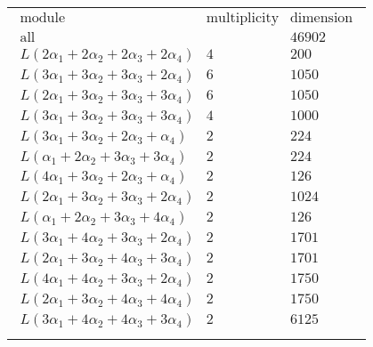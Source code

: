\documentclass[crop,border=2mm]{standalone}
\begin{document}
\begin{tabular}{l}
$\displaystyle
\begin{array}{rll}
	\text{module}&\text{multiplicity}&\text{dimension} \\ \hline \text{all}&&46902 \\
	L\left( 2\alpha_{1}+ 2\alpha_{2}+ 2\alpha_{3}+ 2\alpha_{4}\right)&4&200\\
	L\left( 3\alpha_{1}+ 3\alpha_{2}+ 3\alpha_{3}+ 2\alpha_{4}\right)&6&1050\\
	L\left( 2\alpha_{1}+ 3\alpha_{2}+ 3\alpha_{3}+ 3\alpha_{4}\right)&6&1050\\
	L\left( 3\alpha_{1}+ 3\alpha_{2}+ 3\alpha_{3}+ 3\alpha_{4}\right)&4&1000\\
	L\left( 3\alpha_{1}+ 3\alpha_{2}+ 2\alpha_{3}+\alpha_{4}\right)&2&224\\
	L\left(\alpha_{1}+ 2\alpha_{2}+ 3\alpha_{3}+ 3\alpha_{4}\right)&2&224\\
	L\left( 4\alpha_{1}+ 3\alpha_{2}+ 2\alpha_{3}+\alpha_{4}\right)&2&126\\
	L\left( 2\alpha_{1}+ 3\alpha_{2}+ 3\alpha_{3}+ 2\alpha_{4}\right)&2&1024\\
	L\left(\alpha_{1}+ 2\alpha_{2}+ 3\alpha_{3}+ 4\alpha_{4}\right)&2&126\\
	L\left( 3\alpha_{1}+ 4\alpha_{2}+ 3\alpha_{3}+ 2\alpha_{4}\right)&2&1701\\
	L\left( 2\alpha_{1}+ 3\alpha_{2}+ 4\alpha_{3}+ 3\alpha_{4}\right)&2&1701\\
	L\left( 4\alpha_{1}+ 4\alpha_{2}+ 3\alpha_{3}+ 2\alpha_{4}\right)&2&1750\\
	L\left( 2\alpha_{1}+ 3\alpha_{2}+ 4\alpha_{3}+ 4\alpha_{4}\right)&2&1750\\
	L\left( 3\alpha_{1}+ 4\alpha_{2}+ 4\alpha_{3}+ 3\alpha_{4}\right)&2&6125
\end{array}
$ \\ \\

\end{tabular}
\end{document}
